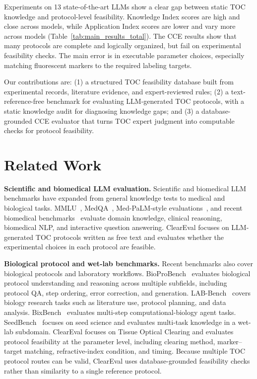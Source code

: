 \documentclass[conference]{IEEEtran}
\begin{document}
Experiments on 13 state-of-the-art LLMs show a clear gap between static TOC
knowledge and protocol-level feasibility. Knowledge Index scores are high and
close across models, while Application Index scores are lower and vary more
across models (Table~\ref{tab:main_results_total}). The CCE results show that
many protocols are complete and logically organized, but fail on experimental
feasibility checks. The main error is in executable parameter choices,
especially matching fluorescent markers to the required labeling targets.

Our contributions are: (1) a structured TOC feasibility database built from
experimental records, literature evidence, and expert-reviewed rules; (2) a
text-reference-free benchmark for evaluating LLM-generated TOC protocols, with a
static knowledge audit for diagnosing knowledge gaps; and (3) a
database-grounded CCE evaluator that turns TOC expert judgment into computable
checks for protocol feasibility.

\section{Related Work}\label{sec:related}

\noindent\textbf{Scientific and biomedical LLM evaluation.}
Scientific and biomedical LLM benchmarks have expanded from general knowledge
tests to medical and biological tasks. MMLU~\cite{hendrycks2021mmlu},
MedQA~\cite{jin2021disease}, Med-PaLM-style
evaluations~\cite{singhal2023medpalm}, and recent biomedical
benchmarks~\cite{zhang2025benchmarking,wang2025cardbiomedbench,feng2024mediq}
evaluate domain knowledge, clinical reasoning, biomedical NLP, and interactive
question answering. ClearEval focuses on LLM-generated TOC protocols written as
free text and evaluates whether the experimental choices in each protocol are
feasible.

\noindent\textbf{Biological protocol and wet-lab benchmarks.}
Recent benchmarks also cover biological protocols and laboratory workflows.
BioProBench~\cite{bioprobench} evaluates biological protocol understanding and
reasoning across multiple subfields, including protocol QA, step ordering,
error correction, and generation. LAB-Bench~\cite{labbench} covers biology
research tasks such as literature use, protocol planning, and data analysis.
BixBench~\cite{bixbench} evaluates multi-step computational-biology agent
tasks. SeedBench~\cite{ying2025seedbench} focuses on seed science and evaluates
multi-task knowledge in a wet-lab subdomain. ClearEval focuses on Tissue
Optical Clearing and evaluates protocol feasibility at the parameter level,
including clearing method, marker--target matching, refractive-index condition,
and timing. Because multiple TOC protocol routes can be valid, ClearEval uses
database-grounded feasibility checks rather than similarity to a single
reference protocol.
\end{document}
